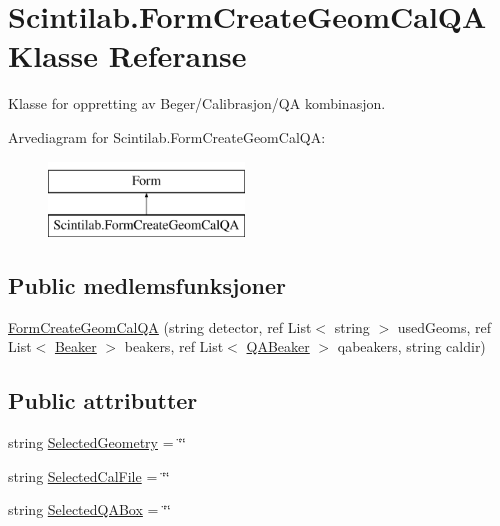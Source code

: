 \hypertarget{class_scintilab_1_1_form_create_geom_cal_q_a}{\section{Scintilab.\+Form\+Create\+Geom\+Cal\+Q\+A Klasse Referanse}
\label{class_scintilab_1_1_form_create_geom_cal_q_a}
}


Klasse for oppretting av Beger/\+Calibrasjon/\+Q\+A kombinasjon.  


Arvediagram for Scintilab.\+Form\+Create\+Geom\+Cal\+Q\+A\+:\begin{figure}[H]
\begin{center}
\leavevmode
\includegraphics[height=2.000000cm]{class_scintilab_1_1_form_create_geom_cal_q_a}
\end{center}
\end{figure}
\subsection*{Public medlemsfunksjoner}
\begin{DoxyCompactItemize}
\item 
\hyperlink{class_scintilab_1_1_form_create_geom_cal_q_a_ad2d6140ba9212d618ccb7397d0eea556}{Form\+Create\+Geom\+Cal\+Q\+A} (string detector, ref List$<$ string $>$ used\+Geoms, ref List$<$ \hyperlink{class_scintilab_1_1_beaker}{Beaker} $>$ beakers, ref List$<$ \hyperlink{class_scintilab_1_1_q_a_beaker}{Q\+A\+Beaker} $>$ qabeakers, string caldir)
\end{DoxyCompactItemize}
\subsection*{Public attributter}
\begin{DoxyCompactItemize}
\item 
string \hyperlink{class_scintilab_1_1_form_create_geom_cal_q_a_aa64c1cbe52c5249ba95a35619a73ceb4}{Selected\+Geometry} = \char`\"{}\char`\"{}
\item 
string \hyperlink{class_scintilab_1_1_form_create_geom_cal_q_a_ad3866120471b431cc990241a9a1e51b2}{Selected\+Cal\+File} = \char`\"{}\char`\"{}
\item 
string \hyperlink{class_scintilab_1_1_form_create_geom_cal_q_a_a5ad3da48ae5babf6d8766ebc2d9e1ad2}{Selected\+Q\+A\+Box} = \char`\"{}\char`\"{}
\end{DoxyCompactItemize}
